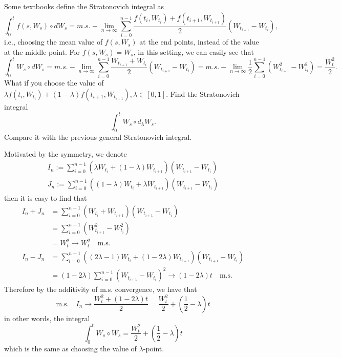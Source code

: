     \problem
    \begin{question}
        Some textbooks define the Stratonovich integral as
        \[\int_0^t f(s,W_s) \circ dW_s=m.s.-\lim_{n\rightarrow \infty}
        \sum_{i=0}^{n-1}\frac{f(t_i,W_{t_i})+f(t_{i+1},W_{t_{i+1}})}{2}(W_{t_{i+1}}-W_{t_i}),\]
        i.e., choosing the mean value of $f(s,W_s)$ at the end points,
        instead of the value at the middle point.  For $f(s,W_s)=W_s$,
        in this setting, we can easily see that
        \[\int_0^t  W_s \circ dW_s= m.s.-\lim_{n\rightarrow \infty}\sum_{i=0}^{n-1}
        \frac{W_{t_{i+1}}+W_{t_i}}{2}(W_{t_{i+1}}-W_{t_i})
        = m.s.-\lim_{n\rightarrow \infty}\frac{1}{2}\sum_{i=0}^{n-1}(W^2_{t_{i+1}}-W^2_{t_i})
        =\frac{W_t^2}{2}.\]
        What if you choose the value of
        $\lambda f(t_i,W_{t_i})+(1-\lambda)f(t_{i+1},W_{t_{i+1}}),\lambda\in[0,1]$.
        Find the Stratonovich integral
        \[\int_0^t  W_s \circ d_\lambda W_s.\]
        Compare it with the previous general Stratonovich integral. 
    \end{question}
    Motivated by the symmetry, we denote
    \newcommand{\sumhead}{\sum_{i=0}^{n-1}}
    \newcommand{\limhead}{\lim_{n\to\infty}}
    \newcommand{\wi}{W_{t_i}}
    \newcommand{\wii}{W_{t_{i+1}}}
    \newcommand{\deltaw}{\wii-\wi}
    \[\begin{aligned}
        I_n:=\sumhead\left(\lambda\wi+(1-\lambda)\wii\right)(\deltaw)\\
        J_n:=\sumhead\left((1-\lambda)\wi+\lambda\wii\right)(\deltaw)
    \end{aligned}\]
    then it is easy to find that
    \[\begin{aligned}
        I_n+J_n&=\sumhead(\wi+\wii)(\deltaw)\\
        &=\sumhead(\wii^2-\wi^2)\\
        &=W_t^2\to W_t^2\quad\text{m.s.}\\
        I_n-J_n&=\sumhead\left((2\lambda-1)\wi+(1-2\lambda)\wii\right)
                         (\deltaw)\\
               &=(1-2\lambda)\sumhead(\deltaw)^2
               \to (1-2\lambda)t\quad\text{m.s.}
    \end{aligned}\]
    Therefore by the additivity of m.s. convergence, we have
    that
    \[\text{m.s.}\quad I_n\to\frac{W_t^2+(1-2\lambda)t}{2}
    =\frac{W_t^2}{2}+\left(\frac{1}{2}-\lambda\right)t\]
    in other words, the integral
    \[\int_0^tW_s\diamond W_s
    =\frac{W_t^2}{2}+\left(\frac{1}{2}-\lambda\right)t\]
    which is the same as choosing the value of $\lambda$-point.

